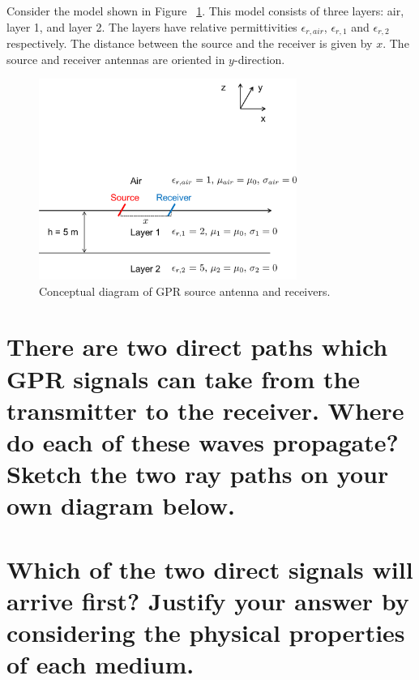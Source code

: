 \documentclass[twosides]{EOSC350Lab} %
\begin{document}
Consider the model shown in Figure ~\ref{fig:profile_line}.
This model consists of three layers: air, layer 1, and layer 2.
The layers have relative permittivities $\epsilon_{r, air}$, $\epsilon_{r, 1}$ and $\epsilon_{r,2}$ respectively.
The distance between the source and the receiver is given by $x$.
The source and receiver antennas are oriented in $y$-direction.


		\begin{figure}[H]
			\centering \includegraphics[width=0.75\textwidth]{Figures/profile_line.png}
			\caption{Conceptual diagram of GPR source antenna and receivers. }
			\label{fig:profile_line}
		\end{figure}






		\part{There are two direct paths which GPR signals can take from the transmitter to the receiver. Where do each of these waves propagate? Sketch the two ray paths on your own diagram below.}


			\vspace*{50pt}

		\part{Which of the two direct signals will arrive first? Justify your answer by considering the physical properties of each medium. }
\end{document}
